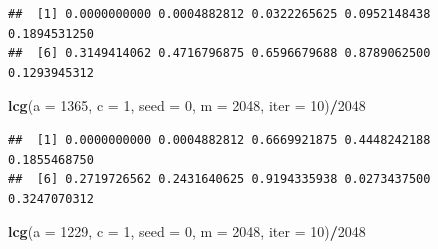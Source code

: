 \documentclass[]{article}
\newenvironment{Shaded}{\begin{snugshade}}{\end{snugshade}}
\newcommand{\KeywordTok}[1]{\textcolor[rgb]{0.13,0.29,0.53}{\textbf{#1}}}
\newcommand{\DataTypeTok}[1]{\textcolor[rgb]{0.13,0.29,0.53}{#1}}
\newcommand{\DecValTok}[1]{\textcolor[rgb]{0.00,0.00,0.81}{#1}}
\newcommand{\StringTok}[1]{\textcolor[rgb]{0.31,0.60,0.02}{#1}}
\newcommand{\ControlFlowTok}[1]{\textcolor[rgb]{0.13,0.29,0.53}{\textbf{#1}}}
\newcommand{\OperatorTok}[1]{\textcolor[rgb]{0.81,0.36,0.00}{\textbf{#1}}}
\newcommand{\NormalTok}[1]{#1}
\begin{document}
\begin{Shaded}
\end{Shaded}

\begin{verbatim}
##  [1] 0.0000000000 0.0004882812 0.0322265625 0.0952148438 0.1894531250
##  [6] 0.3149414062 0.4716796875 0.6596679688 0.8789062500 0.1293945312
\end{verbatim}

\begin{Shaded}
\begin{Highlighting}[]
\KeywordTok{lcg}\NormalTok{(}\DataTypeTok{a =} \DecValTok{1365}\NormalTok{, }\DataTypeTok{c =} \DecValTok{1}\NormalTok{, }\DataTypeTok{seed =} \DecValTok{0}\NormalTok{, }\DataTypeTok{m =} \DecValTok{2048}\NormalTok{, }\DataTypeTok{iter =} \DecValTok{10}\NormalTok{)}\OperatorTok{/}\DecValTok{2048}
\end{Highlighting}
\end{Shaded}

\begin{verbatim}
##  [1] 0.0000000000 0.0004882812 0.6669921875 0.4448242188 0.1855468750
##  [6] 0.2719726562 0.2431640625 0.9194335938 0.0273437500 0.3247070312
\end{verbatim}

\begin{Shaded}
\begin{Highlighting}[]
\KeywordTok{lcg}\NormalTok{(}\DataTypeTok{a =} \DecValTok{1229}\NormalTok{, }\DataTypeTok{c =} \DecValTok{1}\NormalTok{, }\DataTypeTok{seed =} \DecValTok{0}\NormalTok{, }\DataTypeTok{m =} \DecValTok{2048}\NormalTok{, }\DataTypeTok{iter =} \DecValTok{10}\NormalTok{)}\OperatorTok{/}\DecValTok{2048}
\end{Highlighting}
\end{Shaded}
\end{document}
